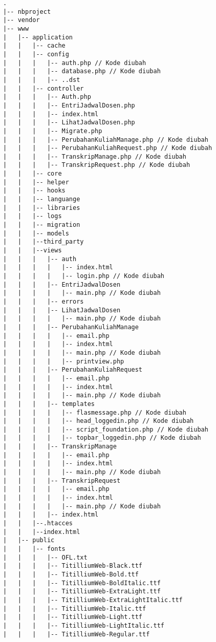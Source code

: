 \begin{lstlisting}[basicstyle=\ttfamily, frame=single, caption=Perubahan isi folder BlueTape,
columns=fullflexible, keepspaces=true, breaklines=true, label={lst:daftarfile}]
.
|-- nbproject
|-- vendor
|-- www
|   |-- application
|   |   |-- cache
|   |   |-- config
|   |   |   |-- auth.php // Kode diubah
|   |   |   |-- database.php // Kode diubah
|   |   |   |-- ..dst
|   |   |-- controller
|   |   |   |-- Auth.php
|   |   |   |-- EntriJadwalDosen.php
|   |   |   |-- index.html
|   |   |   |-- LihatJadwalDosen.php
|   |   |   |-- Migrate.php
|   |   |   |-- PerubahanKuliahManage.php // Kode diubah
|   |   |   |-- PerubahanKuliahRequest.php // Kode diubah
|   |   |   |-- TranskripManage.php // Kode diubah
|   |   |   |-- TranskripRequest.php // Kode diubah
|   |   |-- core
|   |   |-- helper
|   |   |-- hooks
|   |   |-- languange
|   |   |-- libraries
|   |   |-- logs
|   |   |-- migration
|   |   |-- models
|   |   |--third_party
|   |   |--views
|   |   |   |-- auth
|   |   |   |   |-- index.html
|   |   |   |   |-- login.php // Kode diubah
|   |   |   |-- EntriJadwalDosen
|   |   |   |   |-- main.php // Kode diubah
|   |   |   |-- errors
|   |   |   |-- LihatJadwalDosen
|   |   |   |   |-- main.php // Kode diubah
|   |   |   |-- PerubahanKuliahManage
|   |   |   |   |-- email.php
|   |   |   |   |-- index.html
|   |   |   |   |-- main.php // Kode diubah
|   |   |   |   |-- printview.php
|   |   |   |-- PerubahanKuliahRequest
|   |   |   |   |-- email.php
|   |   |   |   |-- index.html
|   |   |   |   |-- main.php // Kode diubah
|   |   |   |-- templates
|   |   |   |   |-- flasmessage.php // Kode diubah
|   |   |   |   |-- head_loggedin.php // Kode diubah
|   |   |   |   |-- script_foundation.php // Kode diubah
|   |   |   |   |-- topbar_loggedin.php // Kode diubah
|   |   |   |-- TranskripManage
|   |   |   |   |-- email.php
|   |   |   |   |-- index.html
|   |   |   |   |-- main.php // Kode diubah
|   |   |   |-- TranskripRequest
|   |   |   |   |-- email.php
|   |   |   |   |-- index.html
|   |   |   |   |-- main.php // Kode diubah
|   |   |   |-- index.html
|   |   |--.htacces
|   |   |--index.html
|   |-- public
|   |   |-- fonts
|   |   |   |-- OFL.txt
|   |   |   |-- TitilliumWeb-Black.ttf
|   |   |   |-- TitilliumWeb-Bold.ttf
|   |   |   |-- TitilliumWeb-BoldItalic.ttf
|   |   |   |-- TitilliumWeb-ExtraLight.ttf
|   |   |   |-- TitilliumWeb-ExtraLightItalic.ttf
|   |   |   |-- TitilliumWeb-Italic.ttf
|   |   |   |-- TitilliumWeb-Light.ttf
|   |   |   |-- TitilliumWeb-LightItalic.ttf
|   |   |   |-- TitilliumWeb-Regular.ttf

\end{lstlisting}
